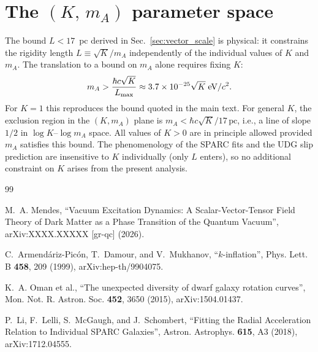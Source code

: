 \documentclass[aps,prd,reprint,floatfix,nofootinbib,superscriptaddress]{revtex4-2}
\begin{document}
\section{The $(K,\,m_A)$ parameter space}
\label{app:KmA}

The bound $L < 17$~pc derived in Sec.~\ref{sec:vector_scale} is
physical: it constrains the rigidity length $L \equiv \sqrt{K}/m_A$
independently of the individual values of $K$ and $m_A$. The
translation to a bound on $m_A$ alone requires fixing $K$:
\begin{equation}
  m_A > \frac{\hbar c \sqrt{K}}{L_{\rm max}}
  \approx 3.7\times10^{-25}\sqrt{K}\;\text{eV}/c^2.
\end{equation}
For $K = 1$ this reproduces the bound quoted in the main text.
For general $K$, the exclusion region in the $(K, m_A)$ plane is
$m_A < \hbar c\sqrt{K}/17\,\text{pc}$, i.e., a line of slope $1/2$
in $\log K$--$\log m_A$ space. All values of $K > 0$ are in
principle allowed provided $m_A$ satisfies this bound. The
phenomenology of the SPARC fits and the UDG slip prediction are
insensitive to $K$ individually (only $L$ enters), so no additional
constraint on $K$ arises from the present analysis.

\begin{thebibliography}{99}

M.~A. Mendes, ``Vacuum Excitation Dynamics: A Scalar-Vector-Tensor
Field Theory of Dark Matter as a Phase Transition of the Quantum
Vacuum'', arXiv:XXXX.XXXXX [gr-qc] (2026).

C.~Armend\'ariz-Pic\'on, T.~Damour, and V.~Mukhanov,
``$k$-inflation'',
Phys. Lett. B \textbf{458}, 209 (1999), arXiv:hep-th/9904075.

K.~A. Oman et al.,
``The unexpected diversity of dwarf galaxy rotation curves'',
Mon. Not. R. Astron. Soc. \textbf{452}, 3650 (2015),
arXiv:1504.01437.

P.~Li, F.~Lelli, S.~McGaugh, and J.~Schombert,
``Fitting the Radial Acceleration Relation to Individual SPARC
Galaxies'',
Astron. Astrophys. \textbf{615}, A3 (2018), arXiv:1712.04555.

\end{thebibliography}
\end{document}
